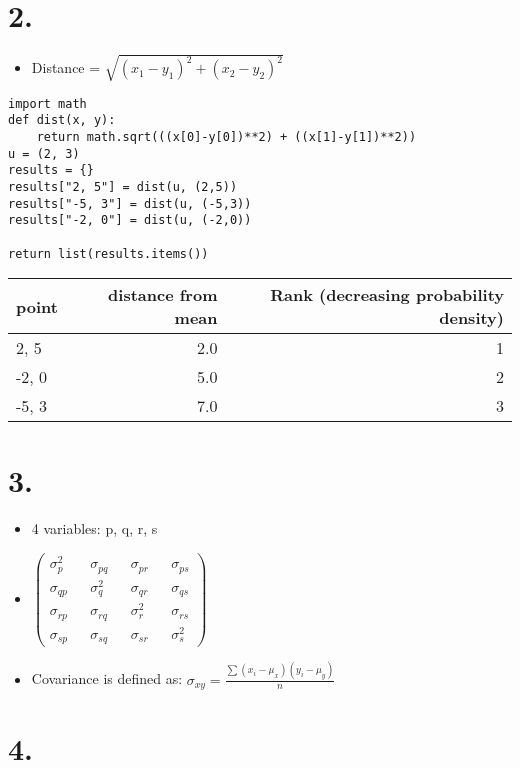\documentclass[11pt]{article}
\begin{document}
\section*{2.}
\label{sec:orgbae3692}
\begin{itemize}
\item Distance = \(\sqrt{(x_1-y_1)^2 + (x_2-y_2)^2}\)
\end{itemize}
\begin{verbatim}
import math
def dist(x, y):
    return math.sqrt(((x[0]-y[0])**2) + ((x[1]-y[1])**2))
u = (2, 3)
results = {}
results["2, 5"] = dist(u, (2,5))
results["-5, 3"] = dist(u, (-5,3))
results["-2, 0"] = dist(u, (-2,0))

return list(results.items())
\end{verbatim}


\begin{center}
\begin{tabular}{lrr}
point & distance from mean & Rank (decreasing probability density)\\
\hline
2, 5 & 2.0 & 1\\
-2, 0 & 5.0 & 2\\
-5, 3 & 7.0 & 3\\
\end{tabular}
\end{center}
\section*{3.}
\label{sec:org10f5d78}
\begin{itemize}
\item 4 variables: p, q, r, s
\item \(\begin{pmatrix} \sigma_{p}^2 && \sigma_{pq} && \sigma_{pr} && \sigma_{ps} \\ \sigma_{qp}&& \sigma_{q}^2 &&
  \sigma_{qr} && \sigma_{qs} \\  \sigma_{rp} && \sigma_{rq} && \sigma_{r}^2 && \sigma_{rs}  \\  \sigma_{sp} && \sigma_{sq} && \sigma_{sr} && \sigma_{s}^2\end{pmatrix}\)
\item Covariance is defined as: \(\sigma_{xy} = \frac{\sum(x_i-\mu_x)(y_i-\mu_y)}{n}\)
\end{itemize}
\section*{4.}
\label{sec:org1cc9540}
\end{document}
